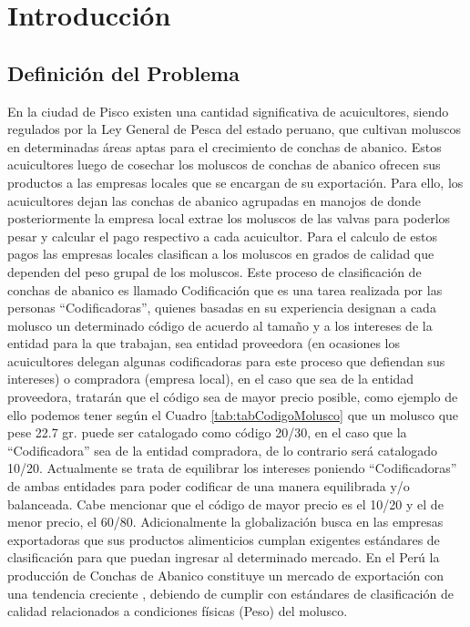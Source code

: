 \chapter{Introducción}
\label{cap:introduccion}

\section{Definición del Problema}
\label{sec:ideacentral}
En la ciudad de Pisco existen una cantidad significativa de acuicultores, siendo regulados por la Ley General de Pesca del estado peruano, que cultivan moluscos en determinadas áreas aptas para el crecimiento de conchas de abanico. Estos acuicultores luego de cosechar los moluscos de conchas de abanico ofrecen sus productos a las empresas locales que se encargan de su exportación. Para ello, los acuicultores dejan las conchas de abanico agrupadas en manojos de donde posteriormente la empresa local extrae los moluscos de las valvas para poderlos pesar y calcular el pago respectivo a cada acuicultor. Para el calculo de estos pagos las empresas locales clasifican a los moluscos en grados de calidad que dependen del peso grupal de los moluscos. Este proceso de clasificación de conchas de abanico es llamado Codificación que es una tarea realizada por las personas ``Codificadoras'', quienes basadas en su experiencia designan a cada molusco un determinado código de acuerdo al tamaño y a los intereses de la entidad para la que trabajan, sea entidad proveedora (en ocasiones los acuicultores delegan algunas codificadoras para este proceso que defiendan sus intereses) o compradora (empresa local), en el caso que sea de la entidad proveedora, tratarán que el código sea de mayor precio posible, como ejemplo de ello podemos tener según el Cuadro \ref{tab:tabCodigoMolusco} que un molusco que pese 22.7 gr. puede ser catalogado como código 20/30, en el caso que la ``Codificadora'' sea de la entidad compradora, de lo contrario será catalogado 10/20. Actualmente se trata de equilibrar los intereses poniendo ``Codificadoras'' de ambas entidades para poder codificar de una manera equilibrada y/o balanceada. Cabe mencionar que el código de mayor precio es el 10/20 y el de menor precio, el 60/80. Adicionalmente la globalización busca en las empresas exportadoras que sus productos alimenticios cumplan exigentes estándares de clasificación para que puedan ingresar al determinado mercado. En el Perú la producción de Conchas de Abanico constituye un mercado de exportación con una tendencia creciente \cite{cit:SUNAT}, debiendo de cumplir con estándares de clasificación de calidad relacionados a condiciones  físicas (Peso) del molusco. 

